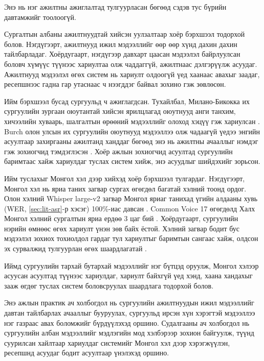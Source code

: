 Энэ нь нэг ажилтны ажиглалтад тулгуурласан бөгөөд сэдэв тус бүрийн давтамжийг тоолоогүй.

Сургалтын албаны ажилтнуудтай хийсэн уулзалтаар хоёр бэрхшээл тодорхой болов. Нэгдүгээрт, ажилтнууд ижил мэдээллийг өөр өөр хүнд дахин дахин тайлбарладаг. Хоёрдугаарт, нэгдүгээр давхарт цаасан мэдээлэл байрлуулсан боловч хүмүүс түүнээс хариултаа олж чаддаггүй, ажилтнаас дэлгэрүүлж асуудаг. Ажилтнууд мэдээлэл өгөх систем нь хариулт олдоогүй үед хаанаас авахыг заадаг, ресепшнээс гадна гар утаснаас ч нээгддэг байвал зохино гэж зөвлөсөн.

Ийм бэрхшээл бусад сургуульд ч ажиглагдсан. Тухайлбал, Милано-Бикокка их сургуулийн зургаан оюутантай хийсэн ярилцлагад оюутнууд анги танхим, хичээлийн хуваарь, шалгалтын өрөөний мэдээллийг олоход хэцүү гэж хариулсан \cite{antico2024unimib}. Burch олон улсын их сургуулийн оюутнууд мэдээллээ олж чадаагүй үедээ энгийн асуултаар захиргааны ажилтанд ханддаг бөгөөд энэ нь ажилтны ачааллыг нэмдэг гэж зохиогчид тэмдэглэсэн \cite{matic2026burch}. Хоёр ажлын зохиогчид асуултад сургуулийн баримтаас хайж хариулдаг туслах систем хийж, энэ асуудлыг шийдэхийг зорьсон.

Ийм туслахыг Монгол хэл дээр хийхэд хоёр бэрхшээл тулгардаг. Нэгдүгээрт, Монгол хэл нь яриа таних загвар сургах өгөгдөл багатай хэлний тоонд ордог. Олон хэлний Whisper large-v2 загвар Монгол яриаг танихад үгийн алдааны хувь (WER, \ref{sec:lit-asr}-р хэсэг) 100\%-иас давсан \cite{radford2023whisper}. Common Voice 17 өгөгдөлд Халх Монгол хэлний сургалтын яриа ердөө 3 цаг бий \cite{mengke2025khalkha}. Хоёрдугаарт, сургуулийн нэрийн өмнөөс өгөх хариулт үнэн зөв байх ёстой. Хэлний загвар бодит бус мэдээлэл зохиох тохиолдол гардаг тул хариултыг баримтын сангаас хайж, олдсон эх сурвалжид тулгуурлан өгөх шаардлагатай \cite{lewis2020rag}.

Иймд сургуулийн тархай бутархай мэдээллийг нэг бүтцэд оруулж, Монгол хэлээр асуусан асуултад түүнээс хариулдаг, хариулт байхгүй үед хэнд, хаана хандахыг зааж өгдөг туслах систем боловсруулах шаардлага тодорхой болов.

Энэ ажлын практик ач холбогдол нь сургуулийн ажилтнуудын ижил мэдээллийг давтан тайлбарлах ачааллыг бууруулах, сургуульд ирсэн хүн хэрэгтэй мэдээллээ нэг газраас авах боломжийг бүрдүүлэхэд оршино. Судалгааны ач холбогдол нь сургуулийн албан мэдээллийг мэдлэгийн мод хэлбэрээр зохион байгуулж, түүнд суурилсан хайлтаар хариулдаг системийг Монгол хэл дээр хэрэгжүүлэн, ресепшнд асуудаг бодит асуултаар үнэлэхэд оршино.


